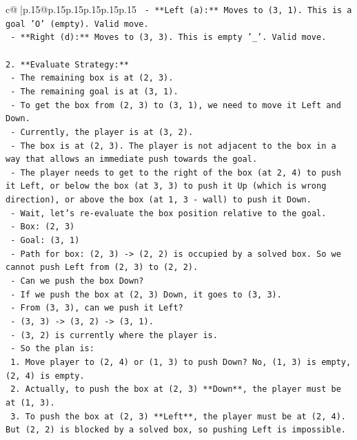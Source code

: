 \documentclass{article}
\begin{document}
{\begin{supertabular}{c@{$\;$}|p{.15\linewidth}@{}p{.15\linewidth}p{.15\linewidth}p{.15\linewidth}p{.15\linewidth}p{.15\linewidth}}
{{{\texttt{    {-} **Left (a):** Moves to (3, 1). This is a goal 'O' (empty). Valid move.} \\
\texttt{    {-} **Right (d):** Moves to (3, 3). This is empty '\_'. Valid move.} \\
\\ 
\texttt{2.  **Evaluate Strategy:**} \\
\texttt{    {-} The remaining box is at (2, 3).} \\
\texttt{    {-} The remaining goal is at (3, 1).} \\
\texttt{    {-} To get the box from (2, 3) to (3, 1), we need to move it Left and Down.} \\
\texttt{    {-} Currently, the player is at (3, 2).} \\
\texttt{    {-} The box is at (2, 3). The player is not adjacent to the box in a way that allows an immediate push towards the goal.} \\
\texttt{    {-} The player needs to get to the right of the box (at 2, 4) to push it Left, or below the box (at 3, 3) to push it Up (which is wrong direction), or above the box (at 1, 3 {-} wall) to push it Down.} \\
\texttt{    {-} Wait, let's re{-}evaluate the box position relative to the goal.} \\
\texttt{        {-} Box: (2, 3)} \\
\texttt{        {-} Goal: (3, 1)} \\
\texttt{    {-} Path for box: (2, 3) {-}> (2, 2) is occupied by a solved box. So we cannot push Left from (2, 3) to (2, 2).} \\
\texttt{    {-} Can we push the box Down?} \\
\texttt{        {-} If we push the box at (2, 3) Down, it goes to (3, 3).} \\
\texttt{        {-} From (3, 3), can we push it Left?} \\
\texttt{        {-} (3, 3) {-}> (3, 2) {-}> (3, 1).} \\
\texttt{        {-} (3, 2) is currently where the player is.} \\
\texttt{        {-} So the plan is:} \\
\texttt{            1. Move player to (2, 4) or (1, 3) to push Down? No, (1, 3) is empty, (2, 4) is empty.} \\
\texttt{            2. Actually, to push the box at (2, 3) **Down**, the player must be at (1, 3).} \\
\texttt{            3. To push the box at (2, 3) **Left**, the player must be at (2, 4). But (2, 2) is blocked by a solved box, so pushing Left is impossible.} \\
}}}
\end{supertabular}}
\end{document}
